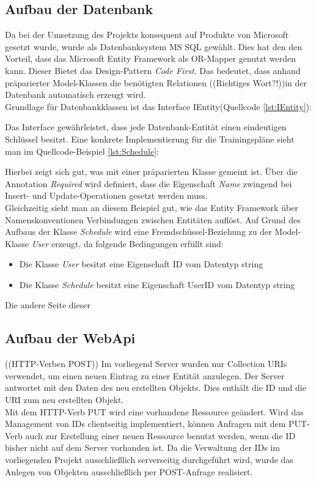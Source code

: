 \subsection{Aufbau der Datenbank}
\label{ssec:aufbau-server-db}
Da bei der Umsetzung des Projekts konsequent auf Produkte von Microsoft gesetzt wurde, wurde als Datenbanksystem MS SQL gewählt. Dies hat den den Vorteil, dass das \ac{Microsoft Entity Framework} als \ac{OR-Mapper} genutzt werden kann. Dieser Bietet das Design-Pattern \textit{Code First}. Das bedeutet, dass anhand präparierter Model-Klassen die benötigten Relationen ((Richtiges Wort?!))in der Datenbank automatisch erzeugt wird. \\
Grundlage für Datenbankklassen ist das Interface IEntity(Quellcode \ref{lst:IEntity}):

Das Interface gewährleistet, dass jede Datenbank-Entität einen eindeutigen Schlüssel besitzt.
Eine konkrete Implementierung für die Trainingspläne sieht man im Quellcode-Beispiel \ref{lst:Schedule}:

Hierbei zeigt sich gut, was mit einer präparierten Klasse gemeint ist. Über die Annotation \emph{Required} wird definiert, dass die Eigenschaft \emph{Name} zwingend bei Insert- und Update-Operationen gesetzt werden muss. \\
Gleichzeitig sieht man an diesem Beispiel gut, wie das Entity Framework über Namenskonventionen Verbindungen zwischen Entitäten auflöst. Auf Grund des Aufbaus der Klasse \emph{Schedule} wird eine Fremdschüssel-Beziehung zu der Model-Klasse \emph{User} erzeugt, da folgende Bedingungen erfüllt sind:
\begin{itemize}
\item Die Klasse \emph{User} besitzt eine Eigenschaft ID vom Datentyp string
\item Die Klasse \emph{Schedule} besitzt eine Eigenschaft UserID vom Datentyp string
\end{itemize}
Die andere Seite dieser 
\subsection{Aufbau der WebApi}
\label{ssec:aufbau-webapi}


((HTTP-Verben POST))
Im vorliegend Server wurden nur Collection URIs verwendet, um einen neuen Eintrag zu einer Entität anzulegen. Der Server antwortet mit den Daten des neu erstellten Objekts. Dies enthält die ID und die URI zum neu erstellten Objekt.\\
Mit dem HTTP-Verb PUT wird eine vorhandene Ressource geändert. Wird das Management von IDs clientseitig implementiert, können Anfragen mit dem PUT-Verb auch zur Erstellung einer neuen Ressource benutzt werden, wenn die ID bisher nicht auf dem Server vorhanden ist. Da die Verwaltung der IDs im vorliegenden Projekt ausschließlich serverseitig durchgeführt wird, wurde das Anlegen von Objekten ausschließlich per POST-Anfrage realisiert. 


